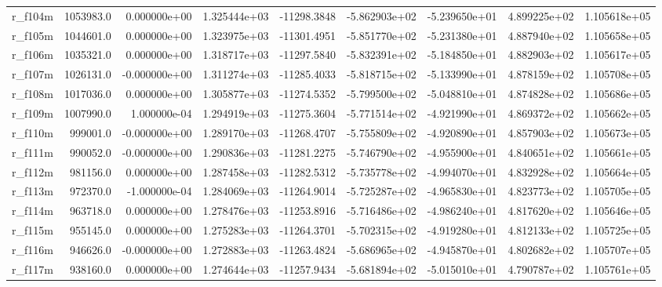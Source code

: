 \documentclass[10pt]{article}
\begin{document}
\begin{landscape}
\begin{longtable}{|l|r|r|r|r|r|r|r|r|}
r\_f104m                 &  1053983.0 &  0.000000e+00 &  1.325444e+03 & -11298.3848 & -5.862903e+02 & -5.239650e+01 &  4.899225e+02 &  1.105618e+05 \\
r\_f105m                 &  1044601.0 &  0.000000e+00 &  1.323975e+03 & -11301.4951 & -5.851770e+02 & -5.231380e+01 &  4.887940e+02 &  1.105658e+05 \\
r\_f106m                 &  1035321.0 &  0.000000e+00 &  1.318717e+03 & -11297.5840 & -5.832391e+02 & -5.184850e+01 &  4.882903e+02 &  1.105617e+05 \\
r\_f107m                 &  1026131.0 & -0.000000e+00 &  1.311274e+03 & -11285.4033 & -5.818715e+02 & -5.133990e+01 &  4.878159e+02 &  1.105708e+05 \\
r\_f108m                 &  1017036.0 &  0.000000e+00 &  1.305877e+03 & -11274.5352 & -5.799500e+02 & -5.048810e+01 &  4.874828e+02 &  1.105686e+05 \\
r\_f109m                 &  1007990.0 &  1.000000e-04 &  1.294919e+03 & -11275.3604 & -5.771514e+02 & -4.921990e+01 &  4.869372e+02 &  1.105662e+05 \\
r\_f110m                 &   999001.0 & -0.000000e+00 &  1.289170e+03 & -11268.4707 & -5.755809e+02 & -4.920890e+01 &  4.857903e+02 &  1.105673e+05 \\
r\_f111m                 &   990052.0 & -0.000000e+00 &  1.290836e+03 & -11281.2275 & -5.746790e+02 & -4.955900e+01 &  4.840651e+02 &  1.105661e+05 \\
r\_f112m                 &   981156.0 &  0.000000e+00 &  1.287458e+03 & -11282.5312 & -5.735778e+02 & -4.994070e+01 &  4.832928e+02 &  1.105664e+05 \\
r\_f113m                 &   972370.0 & -1.000000e-04 &  1.284069e+03 & -11264.9014 & -5.725287e+02 & -4.965830e+01 &  4.823773e+02 &  1.105705e+05 \\
r\_f114m                 &   963718.0 &  0.000000e+00 &  1.278476e+03 & -11253.8916 & -5.716486e+02 & -4.986240e+01 &  4.817620e+02 &  1.105646e+05 \\
r\_f115m                 &   955145.0 &  0.000000e+00 &  1.275283e+03 & -11264.3701 & -5.702315e+02 & -4.919280e+01 &  4.812133e+02 &  1.105725e+05 \\
r\_f116m                 &   946626.0 & -0.000000e+00 &  1.272883e+03 & -11263.4824 & -5.686965e+02 & -4.945870e+01 &  4.802682e+02 &  1.105707e+05 \\
r\_f117m                 &   938160.0 &  0.000000e+00 &  1.274644e+03 & -11257.9434 & -5.681894e+02 & -5.015010e+01 &  4.790787e+02 &  1.105761e+05 \\

\end{longtable}
\end{landscape}
\end{document}
